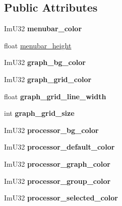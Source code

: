 \subsection*{Public Attributes}
\begin{DoxyCompactItemize}
\item 
\mbox{\label{struct_style_ac3fa8abd110f98de089e832f58e8aaf0}} 
Im\+U32 {\bfseries menubar\+\_\+color}
\item 
float \mbox{\hyperlink{struct_style_a5947362709e6bf98fdbce85e79ed9e62}{menubar\+\_\+height}}
\item 
\mbox{\label{struct_style_a902fd1c3daf51724c6be2ae352593b0d}} 
Im\+U32 {\bfseries graph\+\_\+bg\+\_\+color}
\item 
\mbox{\label{struct_style_a8f97b5a3cffeb66ead2789d6a595579d}} 
Im\+U32 {\bfseries graph\+\_\+grid\+\_\+color}
\item 
\mbox{\label{struct_style_aec562f3e87f9ce4199390e810e3c0da5}} 
float {\bfseries graph\+\_\+grid\+\_\+line\+\_\+width}
\item 
\mbox{\label{struct_style_aa1ddff82eda0eba71e406a83418fa3fe}} 
int {\bfseries graph\+\_\+grid\+\_\+size}
\item 
\mbox{\label{struct_style_aafd6953698a30f47e485b56a9ef209f7}} 
Im\+U32 {\bfseries processor\+\_\+bg\+\_\+color}
\item 
\mbox{\label{struct_style_a7c4c4d8b4e19920b9be6fce357433b2e}} 
Im\+U32 {\bfseries processor\+\_\+default\+\_\+color}
\item 
\mbox{\label{struct_style_a0609e1e67a7074638a5d6dd56b34b8cb}} 
Im\+U32 {\bfseries processor\+\_\+graph\+\_\+color}
\item 
\mbox{\label{struct_style_ae193703063ae5a1c7ed93535a2cd5e46}} 
Im\+U32 {\bfseries processor\+\_\+group\+\_\+color}
\item 
\mbox{\label{struct_style_a6f8f99bef171e5692fa30dc3c6a5e7ed}} 
Im\+U32 {\bfseries processor\+\_\+selected\+\_\+color}
\item 

\end{DoxyCompactItemize}
